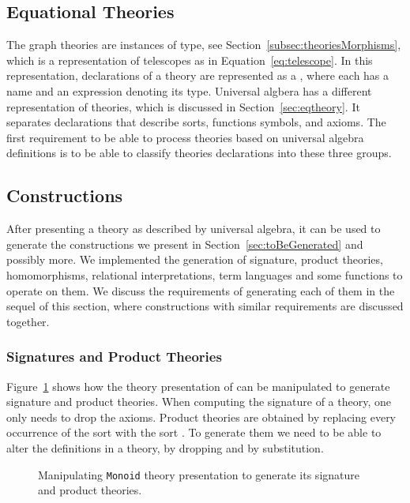 \subsection{Equational Theories}
\label{sec:gen:reqs:eqtheories}
The graph theories are instances of  type, see Section~\ref{subsec:theoriesMorphisms}, which is a representation of telescopes as in Equation~\ref{eq:telescope}. In this representation, declarations of a theory are represented as a \lstmath{[Constr]}, where each  has a name and an expression denoting its type. 
Universal algbera has a different representation of theories, which is discussed in Section~\ref{sec:eqtheory}. It separates declarations that describe sorts, functions symbols, and axioms. The first requirement to be able to process theories based on universal algebra definitions is to be able to classify theories declarations into these three groups. 

\subsection{Constructions}
\label{sec:gen:reqs:constructions}
After presenting a theory as described by universal algebra, it can be used to generate the constructions we present in Section~\ref{sec:toBeGenerated} and possibly more. We implemented the generation of signature, product theories, homomorphisms, relational interpretations, term languages and some functions to operate on them. We discuss the requirements of generating each of them in the sequel of this section, where constructions with similar requirements are discussed together.  

\subsubsection{Signatures and Product Theories}
Figure~\ref{fig:monoid-sig-prod} shows how the theory presentation of  can be manipulated to generate signature and product theories. When computing the signature of a theory, one only needs to drop the axioms. Product theories are obtained by replacing every occurrence of the sort  with the sort . To generate them we need to be able to alter the definitions in a theory, by dropping and by substitution. 

\begin{figure}

\caption{Manipulating \lstinline|Monoid| theory presentation to generate its signature and product theories.}
\label{fig:monoid-sig-prod}
\end{figure}

